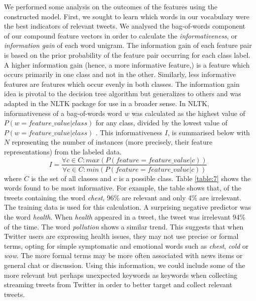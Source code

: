 \documentclass[10pt,letterpaper]{article}
\begin{document}
We performed some analysis on the outcomes of the features using the constructed model. First, we sought to learn which words in our vocabulary were the best indicators of relevant tweets. We analysed the bag-of-words component of our compound feature vectors in order to calculate the \textit{informativeness}, or \textit{information gain} of each word unigram. The information gain of each feature pair is based on the prior probability of the feature pair occurring for each class label. A higher information gain (hence, a more informative feature,) is a feature which occurs primarily in one class and not in the other. Similarly, less informative features are features which occur evenly in both classes. The information gain idea is pivotal to the decision tree algorithm but generalizes to others and was adapted in the NLTK package for use in a broader sense. In NLTK, informativeness of a bag-of-words word $w$ was calculated as the highest value of $P(w=feature\_value|class)$ for any class, divided by the lowest value of $P(w=feature\_value|class)$ \cite{REF89}. This informativeness $I$, is summarised below with $N$ representing the number of instances (more precisely, their feature representations) from the labeled data.  
\begin{displaymath}
I = \frac{\forall c \in C: max(P(feature = feature\_value|c))}{\forall c \in C: min(P(feature = feature\_value|c))} 
\end{displaymath} 
where $C$ is the set of all classes and $c$ is a possible class. Table \ref{table:7} shows the words found to be most informative. For example, the table shows that, of the tweets containing the word \textit{chest}, 96\% are relevant and only 4\% are irrelevant. The training data is used for this calculation. A surprising negative predictor was the word \textit{health}. When \textit{health} appeared in a tweet, the tweet was irrelevant 94\% of the time. The word \textit{pollution} shows a similar trend. This suggests that when Twitter users are expressing health issues, they may not use precise or formal terms, opting for simple symptomatic and emotional words such as \textit{chest}, \textit{cold} or \textit{wow}. The more formal terms may be more often associated with news items or general chat or discussion.  Using this information, we could include some of the more relevant but perhaps unexpected keywords as keywords when collecting streaming tweets from Twitter in order to better target and collect relevant tweets.\\ 
\end{document}
